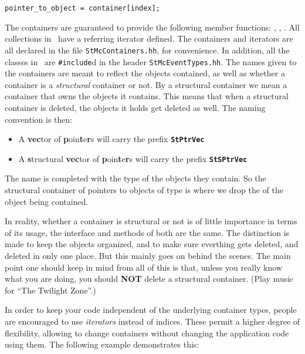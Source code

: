 \verb+pointer_to_object = container[index];+

The containers are guaranteed to provide the following member functions:
, , .  All collections in
\StMcEvent\ have a referring iterator defined.
The containers and iterators are all declared in the file
{\tt StMcContainers.hh}, for convenience.  In addition,
all the classes in \StMcEvent\ are {\tt \#include}d in
the header {\tt StMcEventTypes.hh}.
The names given to the containers are meant to reflect
the objects contained, as well as whether a container is
a {\it structural} container or not.
By a structural container we mean a container that owns the objects
it contains.  This means that when a structural container is deleted,
the objects it holds get deleted as well.  The naming convention
is then:

\begin{itemize}
  \item A {\bf vec}tor of {\bf p}oin{\bf t}e{\bf r}s
will carry the prefix {\bf \tt StPtrVec}
  \item A {\bf s}tructural {\bf vec}tor of {\bf p}oin{\bf t}e{\bf r}s
will carry the prefix {\bf \tt StSPtrVec}
\end{itemize}

The name is completed with the type of the objects they contain.  So
the structural container of pointers to objects of type  is
 where we drop the  of the object being
contained.

In reality, whether a container is structural or not
is of little importance in terms of its usage, the interface and methods of
both are the same.  The distinction is made to keep the objects organized,
and to make sure everthing gets deleted, and deleted in only one place.  But
this mainly goes on behind the scenes.  The main point one should
keep in mind from all of this is that, unless you really know
what you are doing, you should {\bf NOT} delete a
structural container.  (Play music for ``The Twilight Zone''.)


In order to keep your code independent of the underlying container
types, people are encouraged to use \textit{iterators} instead of
indices. These permit a higher degree of flexibility,
allowing to change containers
without changing the application code using them. The following
example demonstrates this:

